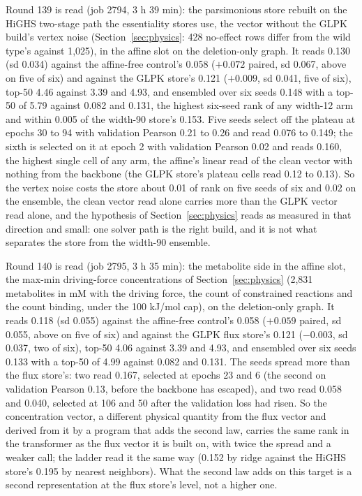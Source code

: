 Round 139 is read (job 2794, 3 h 39 min): the parsimonious store rebuilt on the HiGHS
two-stage path the essentiality stores use, the vector without the GLPK build's vertex
noise (Section~\ref{sec:physics}: 428 no-effect rows differ from the wild type's
against 1,025), in the affine slot on the deletion-only graph. It reads 0.130 (sd
0.034) against the affine-free control's 0.058 ($+0.072$ paired, sd 0.067, above on
five of six) and against the GLPK store's 0.121 ($+0.009$, sd 0.041, five of six),
top-50 4.46 against 3.39 and 4.93, and ensembled over six seeds 0.148 with a top-50 of
5.79 against 0.082 and 0.131, the highest six-seed rank of any width-12 arm and within
0.005 of the width-90 store's 0.153. Five seeds select off the plateau at epochs 30 to
94 with validation Pearson 0.21 to 0.26 and read 0.076 to 0.149; the sixth is selected
on it at epoch 2 with validation Pearson 0.02 and reads 0.160, the highest single cell
of any arm, the affine's linear read of the clean vector with nothing from the backbone
(the GLPK store's plateau cells read 0.12 to 0.13). So the vertex noise costs the
store about 0.01 of rank on five seeds of six and 0.02 on the ensemble, the clean
vector read alone carries more than the GLPK vector read alone, and the hypothesis of
Section~\ref{sec:physics} reads as measured in that direction and small: one solver
path is the right build, and it is not what separates the store from the width-90
ensemble.

Round 140 is read (job 2795, 3 h 35 min): the metabolite side in the affine slot, the
max-min driving-force concentrations of Section~\ref{sec:physics} (2,831 metabolites
in mM with the driving force, the count of constrained reactions and the count binding,
under the 100 kJ/mol cap), on the deletion-only graph. It reads 0.118 (sd 0.055) against
the affine-free control's 0.058 ($+0.059$ paired, sd 0.055, above on five of six) and
against the GLPK flux store's 0.121 ($-0.003$, sd 0.037, two of six), top-50 4.06
against 3.39 and 4.93, and ensembled over six seeds 0.133 with a top-50 of 4.99 against
0.082 and 0.131. The seeds spread more than the flux store's: two read 0.167, selected
at epochs 23 and 6 (the second on validation Pearson 0.13, before the backbone has
escaped), and two read 0.058 and 0.040, selected at 106 and 50 after the validation
loss had risen. So the concentration vector, a different physical quantity from the
flux vector and derived from it by a program that adds the second law, carries the same
rank in the transformer as the flux vector it is built on, with twice the spread and a
weaker call; the ladder read it the same way (0.152 by ridge against the HiGHS store's
0.195 by nearest neighbors). What the second law adds on this target is a second
representation at the flux store's level, not a higher one.

